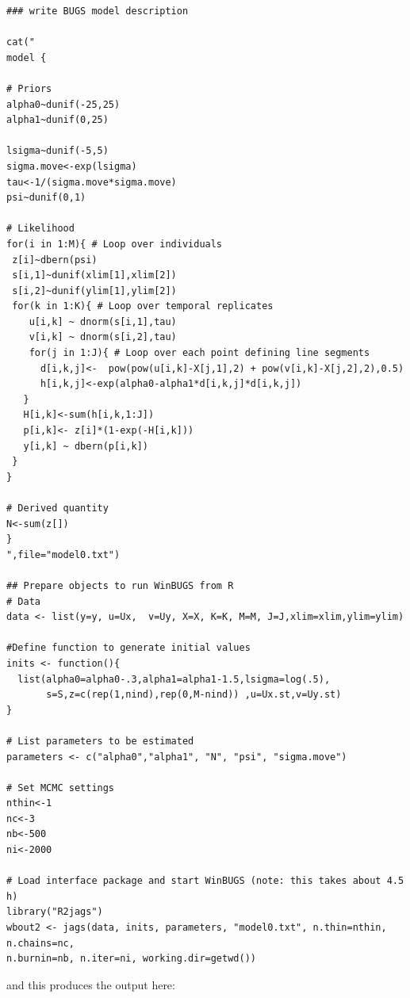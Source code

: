 \begin{verbatim}
### write BUGS model description

cat("
model {

# Priors
alpha0~dunif(-25,25)
alpha1~dunif(0,25)

lsigma~dunif(-5,5)
sigma.move<-exp(lsigma)
tau<-1/(sigma.move*sigma.move)
psi~dunif(0,1)

# Likelihood
for(i in 1:M){ # Loop over individuals
 z[i]~dbern(psi)
 s[i,1]~dunif(xlim[1],xlim[2])
 s[i,2]~dunif(ylim[1],ylim[2])
 for(k in 1:K){ # Loop over temporal replicates
    u[i,k] ~ dnorm(s[i,1],tau)
    v[i,k] ~ dnorm(s[i,2],tau)
    for(j in 1:J){ # Loop over each point defining line segments
      d[i,k,j]<-  pow(pow(u[i,k]-X[j,1],2) + pow(v[i,k]-X[j,2],2),0.5)
      h[i,k,j]<-exp(alpha0-alpha1*d[i,k,j]*d[i,k,j])
   }
   H[i,k]<-sum(h[i,k,1:J])
   p[i,k]<- z[i]*(1-exp(-H[i,k]))
   y[i,k] ~ dbern(p[i,k])
 }
}

# Derived quantity
N<-sum(z[])
}
",file="model0.txt")

## Prepare objects to run WinBUGS from R
# Data
data <- list(y=y, u=Ux,  v=Uy, X=X, K=K, M=M, J=J,xlim=xlim,ylim=ylim)

#Define function to generate initial values
inits <- function(){
  list(alpha0=alpha0-.3,alpha1=alpha1-1.5,lsigma=log(.5),
       s=S,z=c(rep(1,nind),rep(0,M-nind)) ,u=Ux.st,v=Uy.st)
}

# List parameters to be estimated
parameters <- c("alpha0","alpha1", "N", "psi", "sigma.move")

# Set MCMC settings
nthin<-1
nc<-3
nb<-500
ni<-2000

# Load interface package and start WinBUGS (note: this takes about 4.5 h)
library("R2jags")
wbout2 <- jags(data, inits, parameters, "model0.txt", n.thin=nthin, n.chains=nc,
n.burnin=nb, n.iter=ni, working.dir=getwd())
\end{verbatim}

and this produces the output here:


